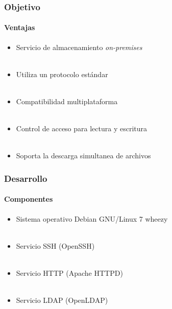 \documentclass{beamer}
\begin{document}
\begin{frame}
\frametitle{Objetivo}
\framesubtitle{Ventajas}
\justifying

\begin{itemize}
\justifying
  \item Servicio de almacenamiento \textit{on-premises}
\\~\\
  \item Utiliza un protocolo est\'{a}ndar
\\~\\
  \item Compatibilidad multiplataforma
\\~\\
  \item Control de acceso para lectura y escritura
\\~\\
  \item Soporta la descarga simultanea de archivos
\end{itemize}

\end{frame}

\begin{frame}
\frametitle{Desarrollo}
\framesubtitle{Componentes}
\justifying

\begin{itemize}
\justifying
  \item Sistema operativo Debian GNU/Linux 7 \guillemotleft wheezy\guillemotright
\\~\\
  \item Servicio SSH (OpenSSH)
\\~\\
  \item Servicio HTTP (Apache HTTPD)
\\~\\
  \item Servicio LDAP (OpenLDAP)
\end{itemize}

\end{frame}
\end{document}
